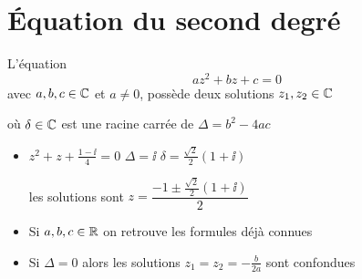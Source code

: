\section{\'Equation du second degr\'e}

\begin{frame}

\begin{proposition}
  L'\'equation \[az^2 + bz + c = 0\]
avec $a, b, c \in \mathbb{C}$ et $a \neq 0$, possède deux solutions $z_1, z_2 \in \mathbb{C}$\\


\pause

o\`u $\delta\in \mathbb{C}$ est une racine carr\'ee de $\Delta = b^2 - 4 ac$
\end{proposition}

\medskip

\pause

\begin{itemize}
  \item $z^2 + z + \frac{1 - \ii }{4}=0$
\pause\quad 
 $\Delta = \ii $ \quad\pause  $\delta = \frac{\sqrt2}{2}(1 +  \ii)$ 

\pause
\vspace*{-1ex}
\hfill les solutions sont $z = \dfrac{- 1 \pm \frac{\sqrt2}{2}(1 +  \ii)}{2}$

\pause
  \item Si $a,b,c \in \mathbb{R}$ on retrouve les formules déjà connues

\pause
  \item Si $\Delta=0$ alors les solutions $z_1 = z_2 = - \frac{b}{2 a}$ sont confondues

\end{itemize}

\end{frame}


